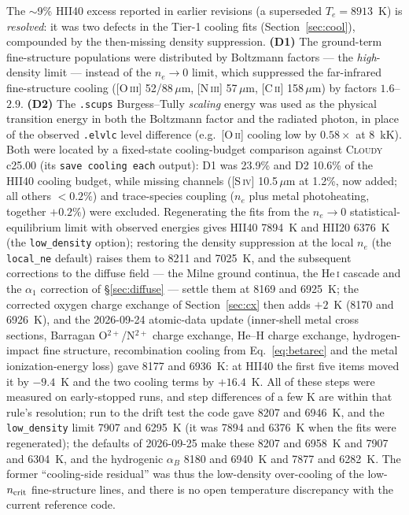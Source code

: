 \documentclass[english,a4paper]{my_memo}
\newcommand{\code}[1]{\texttt{#1}}
\begin{document}
The $\sim$9\% HII40 excess reported in earlier revisions (a superseded
$T_e = 8913$~K) is \emph{resolved}: it was two defects in the Tier-1
cooling fits (Section~\ref{sec:cool}), compounded by the then-missing
density suppression.  \textbf{(D1)} The ground-term fine-structure
populations were distributed by Boltzmann factors --- the
\emph{high}-density limit --- instead of the $n_e\rightarrow0$ limit,
which suppressed the far-infrared fine-structure cooling
([O\,\textsc{iii}] 52/88\,$\mu$m, [N\,\textsc{iii}] 57\,$\mu$m,
[C\,\textsc{ii}] 158\,$\mu$m) by factors $1.6$--$2.9$.
\textbf{(D2)} The \code{.scups} Burgess--Tully \emph{scaling} energy was
used as the physical transition energy in both the Boltzmann factor and
the radiated photon, in place of the observed \code{.elvlc} level
difference (e.g.\ [O\,\textsc{ii}] cooling low by $0.58\times$ at 8~kK).
Both were located by a fixed-state cooling-budget comparison against
\textsc{Cloudy} c25.00 (its \code{save cooling each} output): D1 was
23.9\% and D2 10.6\% of the HII40 cooling budget, while missing channels
([S\,\textsc{iv}] 10.5\,$\mu$m at 1.2\%, now added; all others $<0.2\%$)
and trace-species coupling ($n_e$ plus metal photoheating, together
$+0.2\%$) were excluded.  Regenerating the fits from the
$n_e\rightarrow0$ statistical-equilibrium limit with observed energies
gives HII40 7894~K and HII20 6376~K (the \code{low\_density} option);
restoring the density suppression at the local $n_e$ (the
\code{local\_ne} default) raises them to 8211 and 7025~K, and the
subsequent corrections to the diffuse field --- the Milne ground continua,
the He\,\textsc{i} cascade and the $\alpha_1$ correction of
\S\ref{sec:diffuse} --- settle them at 8169 and 6925~K; the corrected
oxygen charge exchange of Section~\ref{sec:cx} then adds $+2$~K (8170 and
6926~K), and the 2026-09-24 atomic-data update (inner-shell metal cross
sections, Barragan O$^{2+}$/N$^{2+}$ charge exchange, He--H charge
exchange, hydrogen-impact fine structure, recombination cooling from
Eq.~\ref{eq:betarec} and the metal ionization-energy loss) gave 8177 and
6936~K: at HII40 the first five items moved it by $-9.4$~K and the two
cooling terms by $+16.4$~K.  All of these steps were measured on
early-stopped runs, and step differences of a few K are within that rule's
resolution; run to the drift test the code gave 8207 and 6946~K, and the
\code{low\_density} limit 7907 and 6295~K (it was 7894 and 6376~K when the
fits were regenerated); the defaults of 2026-09-25 make these 8207 and
6958~K and 7907 and 6304~K, and the hydrogenic $\alpha_B$ 8180 and 6940~K
and 7877 and 6282~K.  The former
``cooling-side residual'' was thus the low-density over-cooling of the
low-$n_{\rm crit}$ fine-structure lines, and there is no open temperature
discrepancy with the current reference code.
\end{document}
